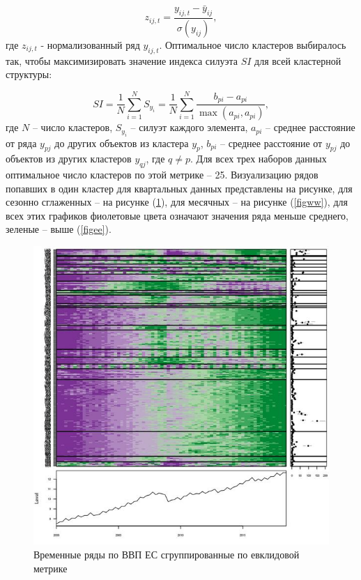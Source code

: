 \documentclass[12pt,a4paper, oneside]{extreport}
\begin{document}
\begin{equation}\label{key}
z_{ij,t} = \dfrac{y_{ij,t} - \bar{y}_{ij}}{\sigma(y_{ij})},  
\end{equation}
где $z_{ij,t}$ - нормализованный ряд $y_{ij,t}$.
Оптимальное число кластеров выбиралось так, чтобы максимизировать значение индекса силуэта $SI$ для всей кластерной структуры: 


\begin{equation}\label{key}
SI = \frac{1}{N} \sum^N_{i=1} S_{y_i}=\frac{1}{N} \sum^N_{i=1} \dfrac{b_{pi}-a_{pi}}{\max(a_{pi}, a_{pi})},
\end{equation}
где $N$ -- число кластеров, $S_{y_i}$ -- силуэт каждого элемента, $a_{pi}$ --   среднее расстояние от ряда $y_{pj}$ до других объектов из кластера $y_p$,  $b_{pi}$ --  среднее расстояние от $y_{pj}$ до  объектов из других  кластеров $y_{qj}$,  где  $q\neq p$.
Для всех трех наборов данных оптимальное число кластеров по этой метрике -- 25. Визуализацию рядов попавших в один кластер для квартальных данных представлены на рисунке, для сезонно сглаженных -- на рисунке (\ref{figqq}), для месячных -- на рисунке (\ref{figww}), для всех этих графиков фиолетовые цвета означают значения ряда меньше среднего, зеленые -- выше (\ref{figee}). 



\begin{figure}
	\centering
	\includegraphics[width=0.6\linewidth]{screenshot014}
	\caption{Временные ряды по ВВП ЕС сгруппированные по евклидовой метрике}
	\label{figqq}
\end{figure}
\end{document}
